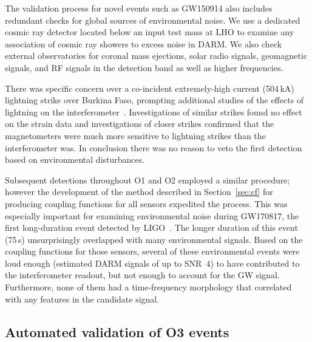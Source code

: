 The validation process for novel events such as GW150914 also includes redundant checks for global sources of environmental noise.
We use a dedicated cosmic ray detector located below an input test mass at \ac{LHO} to examine any association of cosmic ray showers to excess noise in \ac{DARM}.
We also check external observatories for coronal mass ejections, solar radio signals, geomagnetic signals, and \ac{RF} signals in the detection band as well as higher frequencies.

There was specific concern over a co-incident extremely-high current (504\,kA) lightning strike over Burkina Faso, prompting additional studies of the effects of lightning on the interferometer~\citep{Schofield_lightning}.
Investigations of similar strikes found no effect on the strain data and investigations of closer strikes confirmed that the magnetometers were much more sensitive to lightning strikes than the interferometer was.
In conclusion there was no reason to veto the first detection based on environmental disturbances.

Subsequent detections throughout \ac{O1} and \ac{O2} employed a similar procedure; however the development of the method described in Section~\ref{sec:cf} for producing coupling functions for all sensors expedited the process.
This was especially important for examining environmental noise during GW170817, the first long-duration event detected by \ac{LIGO}~\citep{gw170817, Schofield_170817}.
The longer duration of this event (75\,s) unsurprisingly overlapped with many environmental signals.
Based on the coupling functions for those sensors, several of these environmental events were loud enough (estimated \ac{DARM} signals of up to SNR~4) to have contributed to the interferometer readout, but not enough to account for the \ac{GW} signal.
Furthermore, none of them had a time-frequency morphology that correlated with any features in the candidate signal.

\subsection{Automated validation of O3 events}

